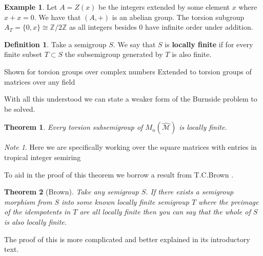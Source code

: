 \documentclass[12pt,a4paper]{amsart}
\newcommand{\Z}{\mathbb{Z}}
\newcommand{\TM}{\mathcal{M}}
\newtheorem{thm}{Theorem}[section]
\theoremstyle{definition}
\newtheorem{defn}{Definition}[section]
\newtheorem{ex}{Example}[section]
\theoremstyle{remark}
\newtheorem*{note}{Note}
\begin{document}
\begin{ex}
Let $A = Z(x)$ be the integers extended by some element $x$ where $x+x=0$. We have that $(A,+)$ is an abelian group. The torsion subgroup $A_T = \{0,x\} \cong \Z/2\Z$ as all integers besides $0$ have infinite order under addition.
\end{ex}

\begin{defn}
Take a semigroup $S$. We say that $S$ is \textbf{locally finite} if for every finite subset $T\subset S$ the subsemigroup generated by $T$ is also finite.
\end{defn}

Shown for torsion groups over complex numbers
Extended to torsion groups of matrices over any field


With all this understood we can state a weaker form of the Burnside problem to be solved.

\begin{thm}\label{thm:Simon1}
Every torsion subsemigroup of $M_n(\hat{\TM})$ is locally finite.
\end{thm}
\begin{note}
Here we are specifically working over the square matrices with entries in tropical integer semiring
\end{note}

To aid in the proof of this theorem we borrow a result from T.C.Brown \cite{brown1969locally}.

\begin{thm}[Brown]\label{thm:Brown}
Take any semigroup $S$. If there exists a semigroup morphism from $S$ into some known locally finite semigroup $T$ where the preimage of the idempotents in $T$ are all locally finite then you can say that the whole of $S$ is also locally finite.
\end{thm}

The proof of this is more complicated and better explained in its introductory text\cite{brown1969locally}.
\end{document}
